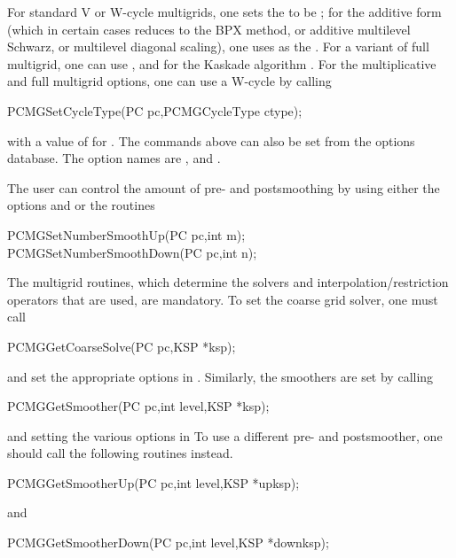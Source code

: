 For standard V or W-cycle multigrids, one sets the  to be  ; for the
additive form (which in certain cases reduces to the BPX method, or additive 
multilevel Schwarz, or multilevel diagonal scaling), one uses
  as the .  For a variant
of full multigrid, one can
 use  , and for the Kaskade 
algorithm  .
For the multiplicative and full multigrid options, one can use a
W-cycle by   calling
\begin{tabbing}
  PCMGSetCycleType(PC pc,PCMGCycleType ctype);
\end{tabbing}
with a value of  for . 
The commands above can also be set from the options database. The option 
names are ,
and  .  

The user can control the amount of pre- and postsmoothing 
  by using
either the options  
  and   or
the routines
\begin{tabbing}
  PCMGSetNumberSmoothUp(PC pc,int m);\\
  PCMGSetNumberSmoothDown(PC pc,int n);
\end{tabbing}

The multigrid routines, which determine
the solvers and interpolation/restriction operators that are used,
are mandatory.
To set the coarse grid solver, one must 
call
\begin{tabbing}
  PCMGGetCoarseSolve(PC pc,KSP *ksp);
\end{tabbing}
and set the appropriate options in . Similarly, the 
smoothers are set by calling
\begin{tabbing}
  PCMGGetSmoother(PC pc,int level,KSP *ksp);
\end{tabbing}
and setting the various options in  
To use a different pre- and postsmoother, one should call the following
routines instead.
\begin{tabbing}
  PCMGGetSmootherUp(PC pc,int level,KSP *upksp);
\end{tabbing}
and 
\begin{tabbing}
  PCMGGetSmootherDown(PC pc,int level,KSP *downksp);
\end{tabbing}

